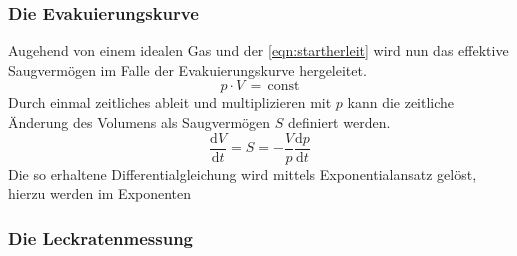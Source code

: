 \subsubsection{Die Evakuierungskurve}
Augehend von einem idealen Gas und der \autoref{eqn:startherleit} wird nun das effektive Saugvermögen im Falle der Evakuierungskurve hergeleitet.
\begin{equation}
    p\cdot V\,=\, \text{const}
    \label{eqn:startherleit}
\end{equation}
Durch einmal zeitliches ableit und multiplizieren mit $p$ kann die zeitliche Änderung des Volumens als Saugvermögen $S$ definiert werden.
\begin{equation}
\frac{\text{d}V}{\text{d}t} = S = - \frac{V}{p} \frac{\text{d}p}{\text{d}t}
\end{equation}
Die so erhaltene Differentialgleichung wird mittels Exponentialansatz gelöst, hierzu werden im Exponenten 
\subsubsection{Die Leckratenmessung}

